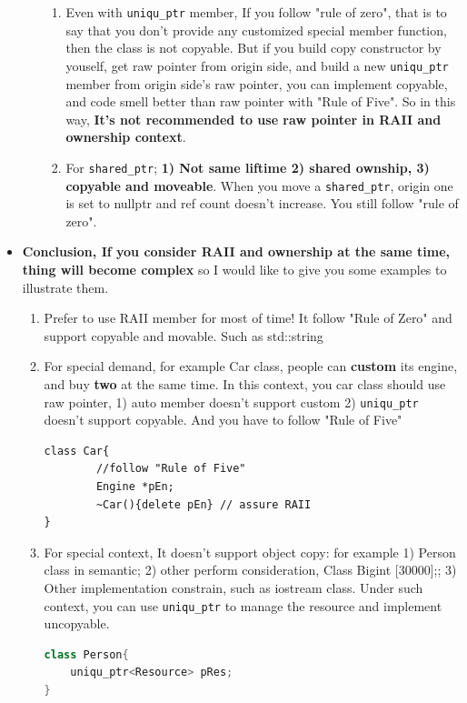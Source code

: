 \documentclass[a4paper,11pt,twoside]{book}
\begin{document}
\begin{itemize}
\begin{enumerate}
\begin{enumerate}
			\item Even with \texttt{uniqu\_ptr} member, If you follow "rule of zero", that is to say that you don't provide any customized special member function, then the class is not copyable. But if you build copy constructor by youself, get raw pointer from origin side, and build a new \texttt{uniqu\_ptr} member from origin side's raw pointer, you can implement copyable, and code smell better than raw pointer with "Rule of Five". So in this way, \textbf{It's not recommended to use raw pointer in RAII and ownership context}.

			\item For \texttt{shared\_ptr}; \textbf{1) Not same liftime 2) shared ownship, 3) copyable and moveable}. When you move a \texttt{shared\_ptr}, origin one is set to nullptr and ref count doesn't increase.  You still follow "rule of zero".
\end{enumerate}

	\end{enumerate}

	
	\item \textbf{ Conclusion, If you consider RAII and ownership at the same time, thing will become complex}  so I would like to give you some examples to illustrate them.
	
	\begin{enumerate}
		\item Prefer to use RAII member for most of time! It follow "Rule of Zero" and support copyable and movable. Such as std::string
		
		\item  For special demand, for example Car class,  people can \textbf{custom} its engine, and buy \textbf{two} at the same time. In this context, you car class should use raw pointer, 1) auto member doesn't support custom 2) \texttt{uniqu\_ptr} doesn't support copyable.  And you have to follow "Rule of Five"
\begin{lstlisting}[numbers=none]
class Car{
		//follow "Rule of Five"
		Engine *pEn;
		~Car(){delete pEn} // assure RAII
}
\end{lstlisting}
		
		\item For special context, It doesn't support object copy: for example 1) Person class in semantic;  2) other  perform consideration, Class Big{int [30000];};  3) Other implementation constrain, such as iostream class. Under such context, you can use \texttt{uniqu\_ptr} to manage the resource and implement uncopyable.
\begin{lstlisting}[frame=single, language=c++]
class Person{
    uniqu_ptr<Resource> pRes;
}
\end{lstlisting}
		

\end{enumerate}
\end{itemize}
\end{document}
